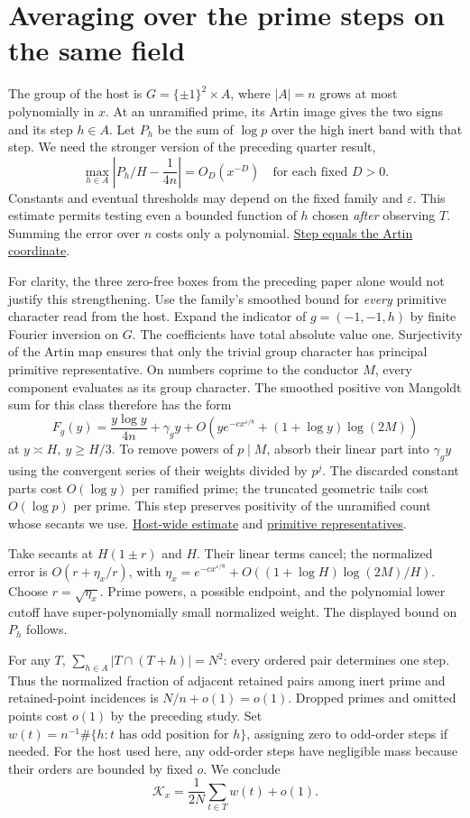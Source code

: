 \documentclass[12pt,letterpaper]{article}
\newcommand{\orig}[3]{\href{https://github.com/nousentllc/riemann-hypothesis/blob/40e56bab026552e089d7afcfeff08d2defb9c005/src/#1.lean\#L#2}{#3}}
\newcommand{\pagepart}[1]{\clearpage\section{#1}}
\begin{document}
\pagepart{Averaging over the prime steps on the same field}
The group of the host is \(G=\{\pm1\}^2\times A\), where \(|A|=n\) grows at most polynomially in \(x\). At an unramified prime, its Artin image gives the two signs and its step \(h\in A\). Let \(P_h\) be the sum of \(\log p\) over the high inert band with that step. We need the stronger version of the preceding quarter result,
\[
 \max_{h\in A}\left|P_h/H-\frac1{4n}\right|=O_D(x^{-D})
 \quad\text{for each fixed }D>0 .
\]
Constants and eventual thresholds may depend on the fixed family and \(\varepsilon\). This estimate permits testing even a bounded function of \(h\) chosen \emph{after} observing \(T\). Summing the error over \(n\) costs only a polynomial.
\orig{Formalism/SharpRestriction/GlobalSchurBounds/FrameCodeOfAdditive}{339}{Step equals the Artin coordinate}.

For clarity, the three zero-free boxes from the preceding paper alone would not justify this strengthening. Use the family's smoothed bound for \emph{every} primitive character read from the host. Expand the indicator of \(g=(-1,-1,h)\) by finite Fourier inversion on \(G\). The coefficients have total absolute value one. Surjectivity of the Artin map ensures that only the trivial group character has principal primitive representative. On numbers coprime to the conductor \(M\), every component evaluates as its group character. The smoothed positive von Mangoldt sum for this class therefore has the form
\[
 F_g(y)=\frac{y\log y}{4n}+\gamma_g y+
 O\!\left(y e^{-c x^{\varepsilon/8}}+(1+\log y)\log(2M)\right)
\]
at \(y\asymp H,\ y\ge H/3\). To remove powers of \(p\mid M\), absorb their linear part into \(\gamma_g y\) using the convergent series of their weights divided by \(p^j\). The discarded constant parts cost \(O(\log y)\) per ramified prime; the truncated geometric tails cost \(O(\log p)\) per prime. This step preserves positivity of the unramified count whose secants we use. \orig{Formalism/SharpRestriction/GlobalSchurBounds/Chosen}{46}{Host-wide estimate} and \orig{Formalism/SharpRestriction/GlobalSchurBounds/Joints}{1084}{primitive representatives}.

Take secants at \(H(1\pm r)\) and \(H\). Their linear terms cancel; the normalized error is \(O(r+\eta_x/r)\), with \(\eta_x=e^{-c x^{\varepsilon/8}}+O((1+\log H)\log(2M)/H)\). Choose \(r=\sqrt{\eta_x}\). Prime powers, a possible endpoint, and the polynomial lower cutoff have super-polynomially small normalized weight. The displayed bound on \(P_h\) follows.

For any \(T\), \(\sum_{h\in A}|T\cap(T+h)|=N^2\): every ordered pair determines one step. Thus the normalized fraction of adjacent retained pairs among inert prime and retained-point incidences is \(N/n+o(1)=o(1)\). Dropped primes and omitted points cost \(o(1)\) by the preceding study. Set \(w(t)=n^{-1}\#\{h:t\text{ has odd position for }h\}\), assigning zero to odd-order steps if needed. For the host used here, any odd-order steps have negligible mass because their orders are bounded by fixed \(o\). We conclude
\[
                  \mathcal K_x=\frac{1}{2N}\sum_{t\in T}w(t)+o(1).
\]
\end{document}

